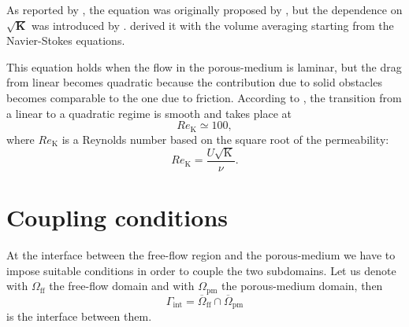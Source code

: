 As reported by \textcite{forch:nield}, the equation was originally proposed by 
\textcite{forch:1901}, but the dependence on $\sqrt{\mathbf{K}}$ was introduced 
by \textcite{forch:ward}. \textcite{volaver:withakerforch} 
derived it with the volume averaging  starting from the Navier-Stokes equations.

This equation holds when the flow in the porous-medium is laminar, but 
the drag from linear becomes quadratic because the contribution due to solid 
obstacles becomes comparable to the one due to friction. According to 
\cite{forch:nield}, the transition from a linear to a quadratic regime is 
smooth and takes place at
\begin{equation}
	Re_\mathrm{K} \simeq 100,
\end{equation}
where $Re_\mathrm{K}$ is a Reynolds number based on the square root of the 
permeability:
\begin{equation}
	Re_\mathrm{K} = \frac{U \sqrt{\mathrm{K}}}{\nu}.
\end{equation}
%
\section{Coupling conditions} \label{sec:coupling}
At the interface between the free-flow region and the porous-medium we have to 
impose suitable conditions in order to couple the two subdomains. Let us denote 
with $\Omega_\text{ff}$ the free-flow domain and with $\Omega_\text{pm}$ the 
porous-medium domain, then
\begin{equation}
	 \Gamma_\text{int} = \overline{\Omega}_\text{ff} \cap 
	 \overline{\Omega}_\text{pm}
\end{equation}
is the interface between them.

